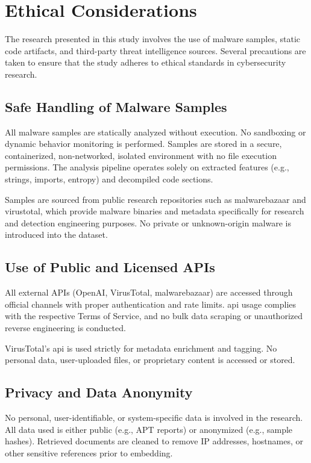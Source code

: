 \section{Ethical Considerations}\label{sec:EthicalConsiderations}
The research presented in this study involves the use of malware samples, static code artifacts,
and third-party threat intelligence sources. Several precautions are taken to ensure that the study
adheres to ethical standards in cybersecurity research.

\subsection{Safe Handling of Malware Samples}
All malware samples are statically analyzed without execution. No sandboxing or dynamic behavior
monitoring is performed. Samples are stored in a secure, containerized, non-networked, isolated
environment with no file execution permissions. The analysis pipeline operates solely on extracted
features (e.g., strings, imports, entropy) and decompiled code sections.

Samples are sourced from public research repositories such as \gls{malwarebazaar} and
\gls{virustotal}, which provide malware binaries and metadata specifically for research and
detection engineering purposes. No private or unknown-origin malware is introduced into the
dataset.

\subsection{Use of Public and Licensed APIs}
All external APIs (OpenAI, VirusTotal, \gls{malwarebazaar}) are accessed through official channels
with proper authentication and rate limits. \gls{api} usage complies with the respective Terms of
Service, and no bulk data scraping or unauthorized reverse engineering is conducted.

VirusTotal’s \gls{api} is used strictly for metadata enrichment and tagging. No personal data,
user-uploaded files, or proprietary content is accessed or stored.

\subsection{Privacy and Data Anonymity}
No personal, user-identifiable, or system-specific data is involved in the research. All data used
is either public (e.g., APT reports) or anonymized (e.g., sample hashes). Retrieved documents are
cleaned to remove IP addresses, hostnames, or other sensitive references prior to embedding.

